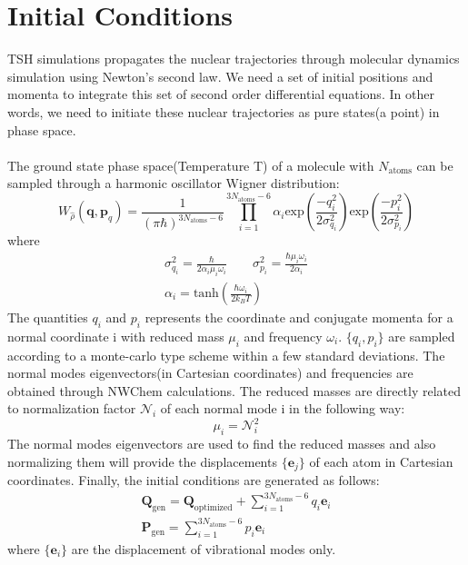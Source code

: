 \section{Initial Conditions}
    TSH simulations propagates the nuclear trajectories through molecular dynamics simulation using Newton's second law. We need a set of initial positions and momenta to integrate this set of second order differential equations. In other words, we need to initiate these nuclear trajectories as pure states(a point) in phase space. \\ \\
    The ground state phase space(Temperature T) of a molecule with $N_{\text{atoms}}$ can be sampled through a harmonic oscillator Wigner distribution:
    \begin{equation}\label{wigner_distribution}
        W_{\hat{\rho}}(\mathbf{q},\mathbf{p}_q) = \frac{1}{(\pi\hbar)^{3N_{\text{atoms}}-6}}\prod_{i=1}^{3N_{\text{atoms}}-6}\alpha_i\text{exp}\left(\frac{-q_i^2}{2\sigma_{q_i}^2}\right)\text{exp}\left(\frac{-p_i^2}{2\sigma_{p_i}^2}\right)
    \end{equation}
    where 
    \begin{equation}
    \begin{gathered}
        \sigma^2_{q_i} = \frac{\hbar}{2\alpha_i\mu_i\omega_i} \qquad
        \sigma^2_{p_i} = \frac{\hbar\mu_i\omega_i}{2\alpha_i} \\ 
        \alpha_i = \text{tanh}\left(\frac{\hbar \omega_i}{2k_BT}\right)
    \end{gathered}
    \end{equation}
    The quantities $q_i$ and $p_i$ represents the coordinate and conjugate momenta for a normal coordinate i with reduced mass $\mu_i$ and frequency $\omega_i$. $\{q_i,p_i\}$ are sampled according to a monte-carlo type scheme within a few standard deviations. The normal modes eigenvectors(in Cartesian coordinates) and frequencies are obtained through NWChem calculations. 
    The reduced masses are directly related to normalization factor $\mathcal{N}_i$ of each normal mode i in the following way\cite{Wilson_1955,gaussian_vib}:
    \begin{equation}
        \mu_i = \mathcal{N}_i^2
    \end{equation}
    The normal modes eigenvectors are used to find the reduced masses and also normalizing them will provide the displacements $\{\mathbf{e}_j\}$ of each atom in Cartesian coordinates. Finally, the initial conditions are generated as follows:
    \begin{gather}
        \mathbf{Q}_{\text{gen}} = \mathbf{Q}_{\text{optimized}} + \sum_{i=1}^{3N_{\text{atoms}}-6}q_i\mathbf{e}_i  \\ 
        \mathbf{P}_{\text{gen}} = \sum_{i=1}^{3N_{\text{atoms}}-6}p_i\mathbf{e}_i
    \end{gather}
    where $\{\mathbf{e}_i\}$ are the displacement of vibrational modes only.
